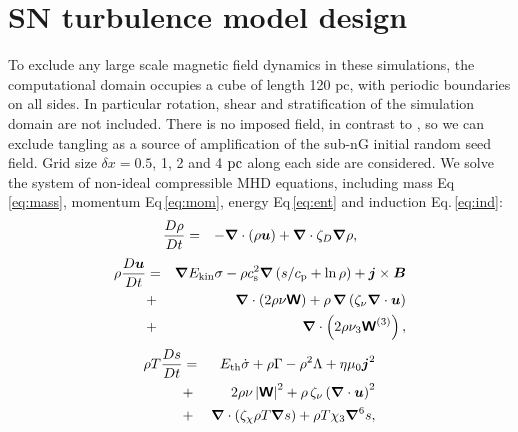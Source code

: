 \documentclass[preprint2]{aastex63}
\newcommand\ESK{E_{\rm kin}}
\newcommand\EST{E_{\rm th}}
\newcommand{\vect}[1]{{{\mbox{\boldmath $#1$}}}}%
\newcommand{\mathbfss}[1]{\textbf{\textsf{#1}}}
\newcommand\pc{~ {\rm pc}}
\begin{document}
\section{SN turbulence model design} \label{sec:model}


To exclude any large scale magnetic field dynamics in these simulations, the
computational domain occupies a cube of length 120 pc, with periodic boundaries
on all sides.
In particular rotation, shear and stratification of the simulation domain are
not included.
There is no imposed field, in contrast to \citet{BKMM04}, so we can exclude
tangling as a source of amplification of the sub-nG initial random seed field.
Grid size $\delta x=0.5$, 1, 2 and 4$\pc$  along each side are considered.
We solve the system of non-ideal compressible MHD equations, including 
mass Eq\,\eqref{eq:mass}, momentum Eq\,\eqref{eq:mom}, energy Eq\,\eqref{eq:ent} and
induction Eq.\,\eqref{eq:ind}:
  \begin{eqnarray}
  \label{eq:mass}
    \frac{D\rho}{Dt} &=& 
    -\vect\nabla \cdot (\rho \vect{u})
    +\vect\nabla \cdot\zeta_D\vect\nabla\rho,
  \end{eqnarray}
  \begin{eqnarray}
  \label{eq:mom}
    \rho\frac{D\vect{u}}{Dt} &=& 
    \vect\nabla{\ESK\sigma}
    -\rho c_{\rm s}^2\vect\nabla\left({s}/{c_{\rm p}}+\ln\rho\right)
    +\vect{j}\times\vect{B}
    \nonumber\\
    &+&\vect\nabla\cdot \left(2\rho\nu{\mathbfss W}\right)
    +\rho\,\vect\nabla\left(\zeta_{\nu}\vect\nabla \cdot \vect{u} \right)
    \nonumber\\
    &+&\vect\nabla\cdot \left(2\rho\nu_3{\mathbfss W}^{(3)}\right),
  \end{eqnarray}
  \begin{eqnarray}
  \label{eq:ent}
    \rho T\frac{D s}{Dt} &=&
     \EST\dot\sigma +\rho\Gamma
    -\rho^2\Lambda +\eta\mu_0\vect{j}^2 
    \nonumber\\
    &+&2 \rho \nu\left|{\mathbfss W}\right|^{2}
    +\rho\,\zeta_{\nu}\left(\vect\nabla \cdot \vect{u} \right)^2
    \nonumber\\
    &+&\vect\nabla\cdot\left(\zeta_\chi\rho T\vect\nabla s\right)
    +\rho T\chi_3\vect\nabla^6 s,
  \end{eqnarray}
\end{document}
